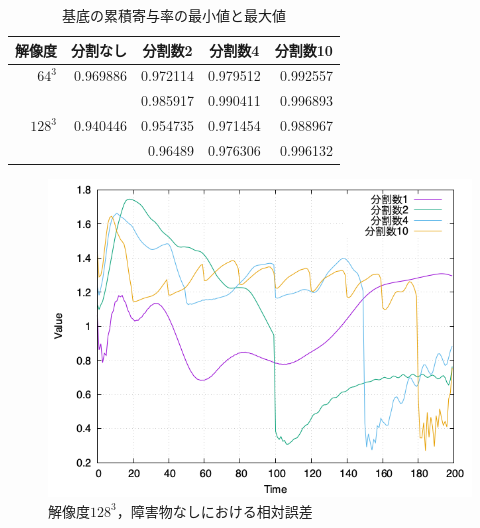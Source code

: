 \documentclass[a4j,12pt]{jreport}
\begin{document}
\begin {table}[htbp]
    \centering
  \caption{基底の累積寄与率の最小値と最大値}
  \label{tab:ruiseki}
  \begin {tabular}{rrrrr} \hline
    \multicolumn{1}{c}{解像度} 					&\multicolumn{1}{c}{分割なし} 		&\multicolumn{1}{c}{分割数2}			&\multicolumn{1}{c}{分割数4} 		&\multicolumn{1}{c}{分割数10}\\ \hline
    $64^3$ 									& 0.969886					& 0.972114						&0.979512	 				&0.992557				\\
    										&							&0.985917						&0.990411					&0.996893				\\ \hline
    $128^3$ 								&0.940446 					&0.954735						&0.971454	 				&0.988967				\\ 
    										&							&0.96489							&0.976306					&0.996132				\\	\hline
  \end {tabular}
\end {table}

\begin{figure}[htbp]
\centering
\includegraphics[width=140mm]{images/128error.png}
\caption{$解像度128^3，障害物なしにおける相対誤差$}
\label{fig:128error}
\end{figure}
\end{document}
